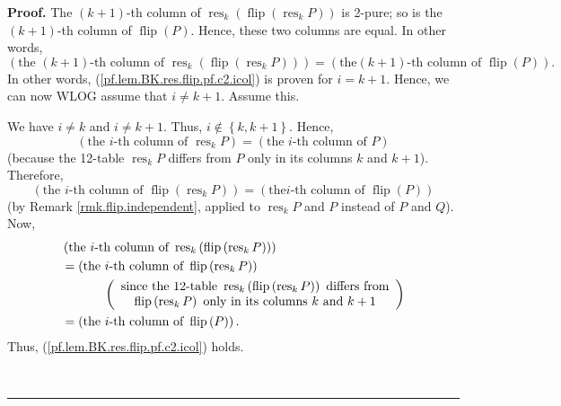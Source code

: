 \documentclass[numbers=enddot,12pt,final,onecolumn,notitlepage]{scrartcl}%
\theoremstyle{definition}
\newenvironment{proof}[1][Proof]{\noindent\textbf{#1.} }{\ \rule{0.5em}{0.5em}}
\begin{document}
\begin{proof}
The $\left(  k+1\right)  $-th column of $\operatorname*{res}\nolimits_{k}%
\left(  \operatorname*{flip}\left(  \operatorname*{res}\nolimits_{k}P\right)
\right)  $ is 2-pure; so is the $\left(  k+1\right)  $-th column of
$\operatorname*{flip}\left(  P\right)  $. Hence, these two columns are equal.
In other words,%
\[
\left(  \text{the }\left(  k+1\right)  \text{-th column of }%
\operatorname*{res}\nolimits_{k}\left(  \operatorname*{flip}\left(
\operatorname*{res}\nolimits_{k}P\right)  \right)  \right)  =\left(  \text{the
}\left(  k+1\right)  \text{-th column of }\operatorname*{flip}\left(
P\right)  \right)  .
\]
In other words, (\ref{pf.lem.BK.res.flip.pf.c2.icol}) is proven for $i=k+1$.
Hence, we can now WLOG assume that $i\neq k+1$. Assume this.

We have $i\neq k$ and $i\neq k+1$. Thus, $i\notin\left\{  k,k+1\right\}  $.
Hence,%
\[
\left(  \text{the }i\text{-th column of }\operatorname*{res}\nolimits_{k}%
P\right)  =\left(  \text{the }i\text{-th column of }P\right)
\]
(because the 12-table $\operatorname*{res}\nolimits_{k}P$ differs from $P$
only in its columns $k$ and $k+1$). Therefore,%
\[
\left(  \text{the }i\text{-th column of }\operatorname*{flip}\left(
\operatorname*{res}\nolimits_{k}P\right)  \right)  =\left(  \text{the
}i\text{-th column of }\operatorname*{flip}\left(  P\right)  \right)
\]
(by Remark \ref{rmk.flip.independent}, applied to $\operatorname*{res}%
\nolimits_{k}P$ and $P$ instead of $P$ and $Q$). Now,%
\begin{align*}
&  \left(  \text{the }i\text{-th column of }\operatorname*{res}\nolimits_{k}%
\left(  \operatorname*{flip}\left(  \operatorname*{res}\nolimits_{k}P\right)
\right)  \right) \\
&  =\left(  \text{the }i\text{-th column of }\operatorname*{flip}\left(
\operatorname*{res}\nolimits_{k}P\right)  \right) \\
&  \ \ \ \ \ \ \ \ \ \ \left(
\begin{array}
[c]{c}%
\text{since the 12-table }\operatorname*{res}\nolimits_{k}\left(
\operatorname*{flip}\left(  \operatorname*{res}\nolimits_{k}P\right)  \right)
\text{ differs from}\\
\operatorname*{flip}\left(  \operatorname*{res}\nolimits_{k}P\right)  \text{
only in its columns }k\text{ and }k+1
\end{array}
\right) \\
&  =\left(  \text{the }i\text{-th column of }\operatorname*{flip}\left(
P\right)  \right)  .
\end{align*}
Thus, (\ref{pf.lem.BK.res.flip.pf.c2.icol}) holds.


\end{proof}
\end{document}
